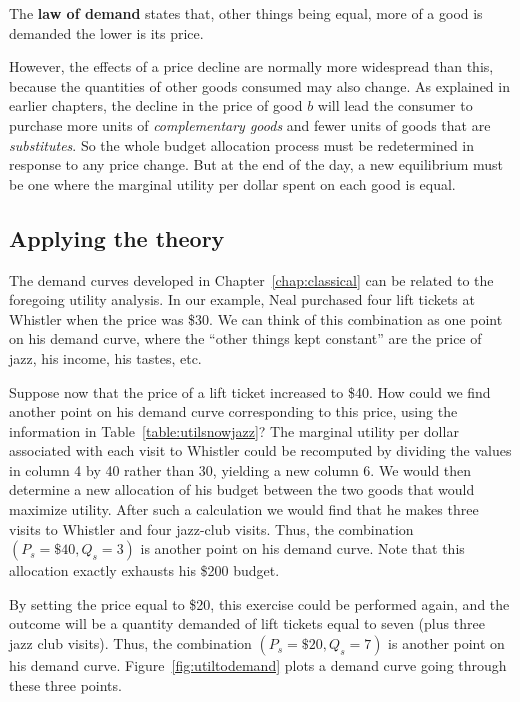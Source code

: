 \begin{DefBox}
	The \textbf{law of demand} states that, other things being equal, more of a good is demanded the lower is its price.
\end{DefBox}

However, the effects of a price decline are normally more widespread than
this, because the quantities of other goods consumed may also change. As
explained in earlier chapters, the decline in the price of good $b$ will lead
the consumer to purchase more units of \textit{complementary goods} and
fewer units of goods that are \textit{substitutes}. So the whole budget
allocation process must be redetermined in response to any price change. But
at the end of the day, a new equilibrium must be one where the marginal
utility per dollar spent on each good is equal.

\newhtmlpage

\subsection*{Applying the theory}

The demand curves developed in Chapter~\ref{chap:classical} can be related
to the foregoing utility analysis. In our example, Neal purchased four lift
tickets at Whistler when the price was \$30. We can think of this
combination as one point on his demand curve, where the ``other things kept
constant'' are the price of jazz, his income, his tastes, etc.

Suppose now that the price of a lift ticket increased to \$40. How could we
find another point on his demand curve corresponding to this price, using
the information in Table~\ref{table:utilsnowjazz}? The marginal utility per
dollar associated with each visit to Whistler could be recomputed by
dividing the values in column 4 by 40 rather than 30, yielding a new column
6. We would then determine a new allocation of his budget between the two
goods that would maximize utility. After such a calculation we would find
that he makes three visits to Whistler and four jazz-club visits. Thus, the
combination $(P_s=\$40,Q_s=3)$ is another point on his demand curve. Note
that this allocation exactly exhausts his \$200 budget.

By setting the price equal to \$20, this exercise could be performed again,
and the outcome will be a quantity demanded of lift tickets equal to seven
(plus three jazz club visits). Thus, the combination $(P_s=\$20,Q_s=7)$ is
another point on his demand curve. Figure~\ref{fig:utiltodemand} plots a
demand curve going through these three points.

